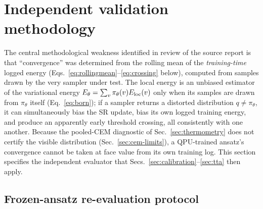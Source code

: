 \section{Independent validation methodology}
\label{sec:validation}

The central methodological weakness identified in review of the source report is that ``convergence'' was determined from the rolling mean of the \emph{training-time} logged energy (Eqs.~\eqref{eq:rollingmean}--\eqref{eq:crossing} below), computed from samples drawn by the very sampler under test. The local energy is an unbiased estimator of the variational energy $E_\theta=\sum_v\pi_\theta(v)E_{\mathrm{loc}}(v)$ only when its samples are drawn from $\pi_\theta$ itself (Eq.~\eqref{eq:born}); if a sampler returns a distorted distribution $q\ne\pi_\theta$, it can simultaneously bias the SR update, bias its own logged training energy, and produce an apparently early threshold crossing, all consistently with one another. Because the pooled-CEM diagnostic of Sec.~\ref{sec:thermometry} does not certify the visible distribution (Sec.~\ref{sec:cem-limits}), a QPU-trained ansatz's convergence cannot be taken at face value from its own training log. This section specifies the independent evaluator that Secs.~\ref{sec:calibration}--\ref{sec:tta} then apply.

\subsection{Frozen-ansatz re-evaluation protocol}
\label{sec:protocol}

